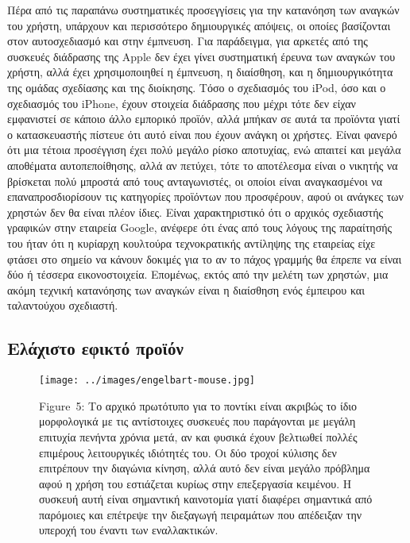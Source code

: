 \documentclass[
]{article}
\begin{document}
Πέρα από τις παραπάνω συστηματικές προσεγγίσεις για την κατανόηση των
αναγκών του χρήστη, υπάρχουν και περισσότερο δημιουργικές απόψεις, οι
οποίες βασίζονται στον αυτοσχεδιασμό και στην έμπνευση. Για παράδειγμα,
για αρκετές από της συσκευές διάδρασης της Apple δεν έχει γίνει
συστηματική έρευνα των αναγκών του χρήστη, αλλά έχει χρησιμοποιηθεί η
έμπνευση, η διαίσθηση, και η δημιουργικότητα της ομάδας σχεδίασης και
της διοίκησης. Τόσο ο σχεδιασμός του iPod, όσο και ο σχεδιασμός του
iPhone, έχουν στοιχεία διάδρασης που μέχρι τότε δεν είχαν εμφανιστεί σε
κάποιο άλλο εμπορικό προϊόν, αλλά μπήκαν σε αυτά τα προϊόντα γιατί ο
κατασκευαστής πίστευε ότι αυτό είναι που έχουν ανάγκη οι χρήστες. Είναι
φανερό ότι μια τέτοια προσέγγιση έχει πολύ μεγάλο ρίσκο αποτυχίας, ενώ
απαιτεί και μεγάλα αποθέματα αυτοπεποίθησης, αλλά αν πετύχει, τότε το
αποτέλεσμα είναι ο νικητής να βρίσκεται πολύ μπροστά από τους
ανταγωνιστές, οι οποίοι είναι αναγκασμένοι να επαναπροσδιορίσουν τις
κατηγορίες προϊόντων που προσφέρουν, αφού οι ανάγκες των χρηστών δεν θα
είναι πλέον ίδιες. Είναι χαρακτηριστικό ότι ο αρχικός σχεδιαστής
γραφικών στην εταιρεία Google, ανέφερε ότι ένας από τους λόγους της
παραίτησής του ήταν ότι η κυρίαρχη κουλτούρα τεχνοκρατικής αντίληψης της
εταιρείας είχε φτάσει στο σημείο να κάνουν δοκιμές για το αν το πάχος
γραμμής θα έπρεπε να είναι δύο ή τέσσερα εικονοστοιχεία. Επομένως, εκτός
από την μελέτη των χρηστών, μια ακόμη τεχνική κατανόησης των αναγκών
είναι η διαίσθηση ενός έμπειρου και ταλαντούχου σχεδιαστή.

\hypertarget{ux3b5ux3bbux3acux3c7ux3b9ux3c3ux3c4ux3bf-ux3b5ux3c6ux3b9ux3baux3c4ux3cc-ux3c0ux3c1ux3bfux3caux3ccux3bd}{%
\subsection{Ελάχιστο εφικτό
προϊόν}\label{ux3b5ux3bbux3acux3c7ux3b9ux3c3ux3c4ux3bf-ux3b5ux3c6ux3b9ux3baux3c4ux3cc-ux3c0ux3c1ux3bfux3caux3ccux3bd}}

\leavevmode{}%
\begin{figure}
\hypertarget{fig:engelbart-mouse}{%
\centering
\texttt{[image: ../images/engelbart-mouse.jpg]}
\caption{Figure~5: Το αρχικό πρωτότυπο για το ποντίκι είναι ακριβώς το
ίδιο μορφολογικά με τις αντίστοιχες συσκευές που παράγονται με μεγάλη
επιτυχία πενήντα χρόνια μετά, αν και φυσικά έχουν βελτιωθεί πολλές
επιμέρους λειτουργικές ιδιότητές του. Οι δύο τροχοί κύλισης δεν
επιτρέπουν την διαγώνια κίνηση, αλλά αυτό δεν είναι μεγάλο πρόβλημα αφού
η χρήση του εστιάζεται κυρίως στην επεξεργασία κειμένου. Η συσκευή αυτή
είναι σημαντική καινοτομία γιατί διαφέρει σημαντικά από παρόμοιες και
επέτρεψε την διεξαγωγή πειραμάτων που απέδειξαν την υπεροχή του έναντι
των εναλλακτικών.}\label{fig:engelbart-mouse}
}
\end{figure}
\end{document}

